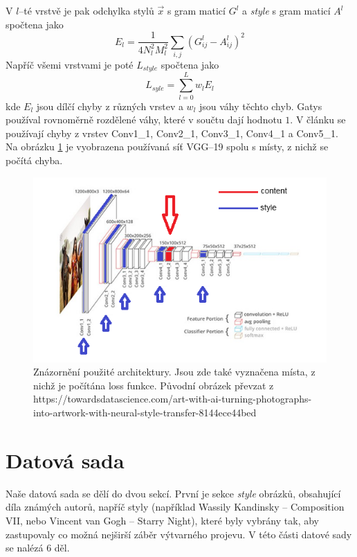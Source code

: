 \documentclass[twocolumn]{article}
\begin{document}
	V $l$--té vrstvě je pak odchylka stylů $\overrightarrow{x}$ s gram maticí $G^l$ a \textit{style} s gram maticí $A^l$ spočtena jako
	\begin{equation*}
		E_l = \frac{1}{4N_l^2M^2_l} \sum_{i,j}(G_{ij}^l - A_{ij}^l)^2
	\end{equation*}
	Napříč všemi vrstvami je poté $L_{style}$ spočtena jako
		\begin{equation*}
		L_{syle} = \sum_{l=0}^{L} w_l E_l
	\end{equation*}
	kde $E_l$ jsou dílčí chyby z různých vrstev a $w_l$ jsou váhy těchto chyb. Gatys používal rovnoměrně rozdělené váhy, které v součtu dají hodnotu $1$. V článku se používají chyby z vrstev Conv1\_1, Conv2\_1, Conv3\_1, Conv4\_1 a Conv5\_1.
	\\
	Na obrázku \ref{VGG} je vyobrazena používaná síť VGG--19 spolu s místy, z nichž se počítá chyba.
	\begin{figure}[h]
	\includegraphics[width=\linewidth]{VGG.png}
	\caption{Znázornění použité architektury. Jsou zde také vyznačena místa, z nichž je počítána loss funkce. Původní obrázek převzat z https://towardsdatascience.com/art-with-ai-turning-photographs-into-artwork-with-neural-style-transfer-8144ece44bed}
	\label{VGG}
\end{figure}
	
\section*{Datová sada}
	Naše datová sada se dělí do dvou sekcí. První je sekce \textit{style} obrázků, obsahující díla známých autorů, napříč styly (například Wassily Kandinsky -- Composition VII, nebo Vincent van Gogh -- Starry Night), které byly vybrány tak, aby zastupovaly co možná nejširší záběr výtvarného projevu. V této části datové sady se nalézá 6 děl. 
	\par
	
\end{document}
